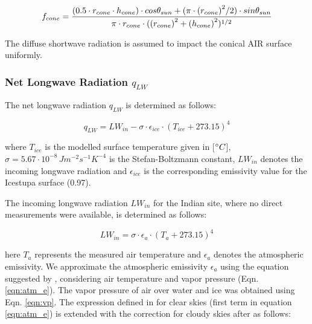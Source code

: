 \documentclass[utf8]{frontiersSCNS}
\begin{document}
\begin{equation}
	\begin{split}
		f_{cone}& =\frac{(0.5 \cdot r_{cone} \cdot h_{cone}) \cdot cos \theta_{sun} +(\pi \cdot
			{(r_{cone})}^2/2) \cdot sin \theta_{sun} }{\pi \cdot r_{cone} \cdot ({(r_{cone})}^2+{(h_{cone})}^2)^{1/2}}\\
	\end{split}
	\label{eqn:f_{cone}}
\end{equation}

The diffuse shortwave radiation is assumed to impact the conical AIR surface uniformly.

\subsubsection{Net Longwave Radiation \texorpdfstring{$q_{LW}$}{Lg}} \label{sec:LW}

The net longwave radiation $q_{LW}$ is determined as follows:

\begin{equation}
	q_{LW}= LW_{in}-\sigma \cdot \epsilon_{ice} \cdot {(T_{ice}+ 273.15)}^4
	\label{eqn:LW}
\end{equation}

where $T_{ice}$ is the modelled surface temperature given in [$\degree C$],
$\sigma=5.67\cdot10^{-8}\,Jm^{-2}s^{-1}K^{-4}$ is the Stefan-Boltzmann constant, $LW_{in}$ denotes the incoming
longwave radiation and $\epsilon_{ice}$ is the corresponding emissivity value for the Icestupa surface (0.97).

The incoming longwave radiation $LW_{in}$ for the Indian site, where no direct measurements were available, is
determined as follows:

\begin{equation}
	LW_{in}=\sigma \cdot \epsilon_a \cdot {(T_a+ 273.15)}^4
	\label{eqn:LWin}
\end{equation}

here $T_a$ represents the measured air temperature and $\epsilon_a$ denotes the atmospheric emissivity. We
approximate the atmospheric emissivity $\epsilon_a$ using the equation suggested by \cite{Brutsaert_1982},
considering air temperature and vapor pressure (Eqn.  \ref{eqn:atm_e}). The vapor pressure of air over water and
ice was obtained using Eqn. \ref{eqn:vp}.  The expression defined in \cite{Brutsaert_1975} for clear skies
(first term in equation \ref{eqn:atm_e}) is extended with the correction for cloudy skies after
\cite{Brutsaert_1982} as follows:
\end{document}
